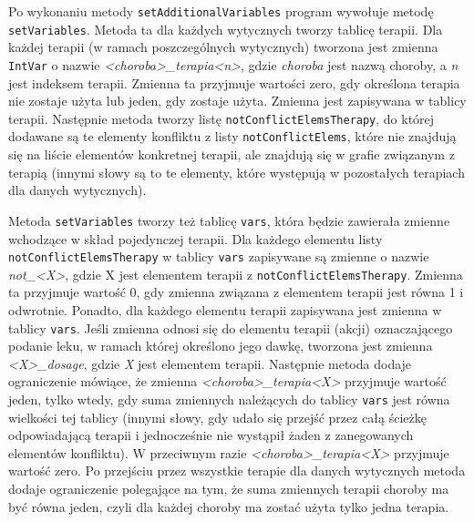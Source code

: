 Po wykonaniu metody \texttt{setAdditionalVariables} program wywołuje metodę \texttt{setVariables}. Metoda ta dla każdych wytycznych tworzy tablicę terapii. Dla każdej terapii (w ramach poszczególnych wytycznych) tworzona jest zmienna \texttt{IntVar} o nazwie \textit{<choroba>\_terapia<n>}, gdzie \textit{choroba} jest nazwą choroby, a \textit{n} jest indeksem terapii. Zmienna ta przyjmuje wartości zero, gdy  określona terapia nie zostaje użyta lub jeden, gdy zostaje użyta. Zmienna jest zapisywana w tablicy terapii. Następnie metoda tworzy listę \texttt{notConflictElemsTherapy}, do której dodawane są te elementy konfliktu z listy \texttt{notConflictElems}, które nie znajdują się na liście elementów konkretnej terapii, ale znajdują się w grafie związanym z terapią (innymi słowy są to te elementy, które występują w pozostałych terapiach dla danych wytycznych). 

Metoda \texttt{setVariables} tworzy też tablicę \texttt{vars}, która będzie zawierała zmienne wchodzące w skład pojedynczej terapii. Dla każdego elementu listy \texttt{notConflictElemsTherapy} w tablicy \texttt{vars} zapisywane są zmienne o nazwie \textit{not\_<X>}, gdzie X jest elementem terapii z \texttt{notConflictElems\-Therapy}. Zmienna ta przyjmuje wartość 0, gdy zmienna związana z elementem terapii jest równa 1 i odwrotnie. Ponadto, dla każdego elementu terapii zapisywana jest zmienna w tablicy \texttt{vars}. Jeśli zmienna odnosi się do elementu terapii (akcji) oznaczającego podanie leku, w ramach której określono jego dawkę, tworzona jest zmienna \textit{<X>\_dosage}, gdzie \textit{X} jest elementem terapii. Następnie metoda dodaje ograniczenie mówiące, że zmienna \textit{<choroba>\_terapia<X>} przyjmuje wartość jeden, tylko wtedy, gdy suma zmiennych należących do tablicy \texttt{vars} jest równa wielkości tej tablicy (innymi słowy, gdy udało się przejść przez całą ścieżkę odpowiadającą terapii i jednocześnie nie wystąpił żaden z zanegowanych elementów konfliktu). W przeciwnym razie \textit{<choroba>\_terapia<X>} przyjmuje wartość zero. Po przejściu przez wszystkie terapie dla danych wytycznych metoda dodaje ograniczenie polegające na tym, że suma zmiennych terapii choroby ma być równa jeden, czyli dla każdej choroby ma zostać użyta tylko jedna terapia. 

